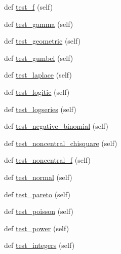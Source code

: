 \begin{DoxyCompactItemize}
\item 
def \hyperlink{classnumpy_1_1random_1_1tests_1_1test__smoke_1_1RNG_a1e7ea157634232953b1db85ff7f6b194}{test\+\_\+f} (self)
\item 
def \hyperlink{classnumpy_1_1random_1_1tests_1_1test__smoke_1_1RNG_a41c257bd9817545a32659c9fed175de1}{test\+\_\+gamma} (self)
\item 
def \hyperlink{classnumpy_1_1random_1_1tests_1_1test__smoke_1_1RNG_aaca5db6556187cb8a9739d9176da4e31}{test\+\_\+geometric} (self)
\item 
def \hyperlink{classnumpy_1_1random_1_1tests_1_1test__smoke_1_1RNG_aa57c50474a65f884ba2732f4033ddfd2}{test\+\_\+gumbel} (self)
\item 
def \hyperlink{classnumpy_1_1random_1_1tests_1_1test__smoke_1_1RNG_ae15d1652359380d9e21a13af293c7be8}{test\+\_\+laplace} (self)
\item 
def \hyperlink{classnumpy_1_1random_1_1tests_1_1test__smoke_1_1RNG_a6fa787cccc2472b183faa6e9c4996a14}{test\+\_\+logitic} (self)
\item 
def \hyperlink{classnumpy_1_1random_1_1tests_1_1test__smoke_1_1RNG_a0ab57d7d78b5537fc5a5233d927b04f6}{test\+\_\+logseries} (self)
\item 
def \hyperlink{classnumpy_1_1random_1_1tests_1_1test__smoke_1_1RNG_aca8bb1b2edb9cd3faf81e7fd555833c2}{test\+\_\+negative\+\_\+binomial} (self)
\item 
def \hyperlink{classnumpy_1_1random_1_1tests_1_1test__smoke_1_1RNG_a25a6035d89eb4e72457f72bb39882eff}{test\+\_\+noncentral\+\_\+chisquare} (self)
\item 
def \hyperlink{classnumpy_1_1random_1_1tests_1_1test__smoke_1_1RNG_ab4ddc71edde88b0e54ea4f9dfc850fa1}{test\+\_\+noncentral\+\_\+f} (self)
\item 
def \hyperlink{classnumpy_1_1random_1_1tests_1_1test__smoke_1_1RNG_a3a9c4fb74a72a0f71533591455a841a3}{test\+\_\+normal} (self)
\item 
def \hyperlink{classnumpy_1_1random_1_1tests_1_1test__smoke_1_1RNG_a648ae1a65504a69b1bb834276441e09a}{test\+\_\+pareto} (self)
\item 
def \hyperlink{classnumpy_1_1random_1_1tests_1_1test__smoke_1_1RNG_a4c6301171f88259d5d501d8d9e61e5aa}{test\+\_\+poisson} (self)
\item 
def \hyperlink{classnumpy_1_1random_1_1tests_1_1test__smoke_1_1RNG_ae2903826049c973854ca4eb55addac10}{test\+\_\+power} (self)
\item 
def \hyperlink{classnumpy_1_1random_1_1tests_1_1test__smoke_1_1RNG_ada8961a5243928b93a8512a8f2cccaec}{test\+\_\+integers} (self)

\end{DoxyCompactItemize}
